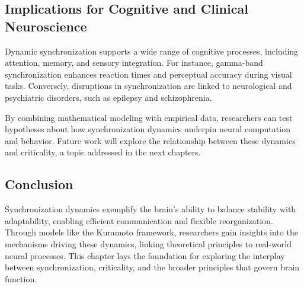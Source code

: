 \subsection*{Implications for Cognitive and Clinical Neuroscience}

Dynamic synchronization supports a wide range of cognitive processes, including attention, memory, and sensory integration. For instance, gamma-band synchronization enhances reaction times and perceptual accuracy during visual tasks. Conversely, disruptions in synchronization are linked to neurological and psychiatric disorders, such as epilepsy and schizophrenia.

By combining mathematical modeling with empirical data, researchers can test hypotheses about how synchronization dynamics underpin neural computation and behavior. Future work will explore the relationship between these dynamics and criticality, a topic addressed in the next chapters.

\subsection*{Conclusion}

Synchronization dynamics exemplify the brain’s ability to balance stability with adaptability, enabling efficient communication and flexible reorganization. Through models like the Kuramoto framework, researchers gain insights into the mechanisms driving these dynamics, linking theoretical principles to real-world neural processes. This chapter lays the foundation for exploring the interplay between synchronization, criticality, and the broader principles that govern brain function.
